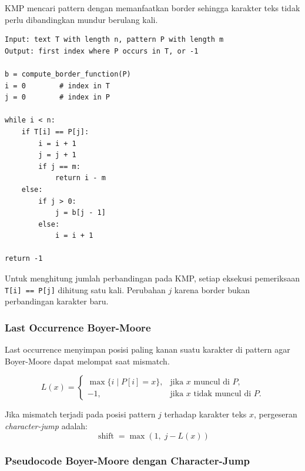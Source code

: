 \begin{jawab}
KMP mencari pattern dengan memanfaatkan border sehingga karakter teks tidak perlu dibandingkan mundur berulang kali.
\end{jawab}

\begin{lstlisting}[caption={Pseudocode KMP}, label={lst:kmp-string-matching}]
Input: text T with length n, pattern P with length m
Output: first index where P occurs in T, or -1

b = compute_border_function(P)
i = 0        # index in T
j = 0        # index in P

while i < n:
    if T[i] == P[j]:
        i = i + 1
        j = j + 1
        if j == m:
            return i - m
    else:
        if j > 0:
            j = b[j - 1]
        else:
            i = i + 1

return -1
\end{lstlisting}

Untuk menghitung jumlah perbandingan pada KMP, setiap eksekusi pemeriksaan \texttt{T[i] == P[j]} dihitung satu kali. Perubahan $j$ karena border bukan perbandingan karakter baru.

\subsubsection{Last Occurrence Boyer-Moore}

\begin{jawab}
Last occurrence menyimpan posisi paling kanan suatu karakter di pattern agar Boyer-Moore dapat melompat saat mismatch.
\end{jawab}

\begin{equation}
    L(x)=
    \begin{cases}
    \max\{i \mid P[i]=x\}, & \text{jika } x \text{ muncul di } P,\\
    -1, & \text{jika } x \text{ tidak muncul di } P.
    \end{cases}
    \label{eq:sm-bm-last-occurrence}
\end{equation}

Jika mismatch terjadi pada posisi pattern $j$ terhadap karakter teks $x$, pergeseran \textit{character-jump} adalah:
\begin{equation}
    \operatorname{shift}=\max(1,\; j-L(x))
    \label{eq:sm-bm-shift}
\end{equation}

\subsubsection{Pseudocode Boyer-Moore dengan Character-Jump}

